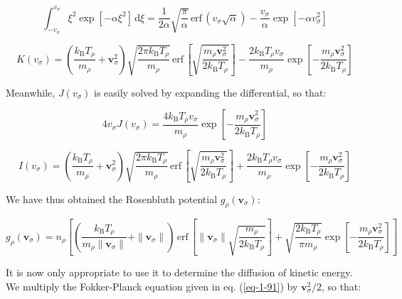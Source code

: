 \begin{equation}
    \int_{-v_\sigma}^{v_\sigma}\xi^2\exp{[-\alpha\xi^2]}\,\mathrm{d}\xi=\frac{1}{2\alpha}\sqrt{\frac{\pi}{\alpha}}\,\text{erf}\,(v_\sigma\sqrt{\alpha})-\frac{v_\sigma}{\alpha}\exp{[-\alpha v_\sigma^2]}
\end{equation}

\begin{equation}
    K(v_\sigma)=\left(\frac{k_\mathrm{B}T_\rho}{m_\rho}+\mathbf{v}_\sigma^2\right)\sqrt{\frac{2\pi k_\mathrm{B}T_\rho}{m_\rho}}\,\text{erf}\,\left[\sqrt{\frac{m_\rho\mathbf{v}_\sigma^2}{2k_\mathrm{B}T_\rho}}\right]-\frac{2k_\mathrm{B}T_\rho v_\sigma}{m_\rho}\exp{\left[-\frac{m_\rho\mathbf{v}_\sigma^2}{2k_\mathrm{B}T_\rho}\right]}
\end{equation}

Meanwhile, $J(v_\sigma)$ is easily solved by expanding the differential, so that:

\begin{equation}
    4v_\sigma J(v_\sigma)=\frac{4k_\mathrm{B}T_\rho v_\sigma}{m_\rho}\exp{\left[-\frac{m_\rho\mathbf{v}_\sigma^2}{2k_\mathrm{B}T_\rho}\right]}
\end{equation}

\begin{equation}
    I(v_\sigma)=\left(\frac{k_\mathrm{B}T_\rho}{m_\rho}+\mathbf{v}_\sigma^2\right)\sqrt{\frac{2\pi k_\mathrm{B}T_\rho}{m_\rho}}\,\text{erf}\,\left[\sqrt{\frac{m_\rho\mathbf{v}_\sigma^2}{2k_\mathrm{B}T_\rho}}\right]+\frac{2k_\mathrm{B}T_\rho v_\sigma}{m_\rho}\exp{\left[-\frac{m_\rho\mathbf{v}_\sigma^2}{2k_\mathrm{B}T_\rho}\right]}
\end{equation}

We have thus obtained the Rosenbluth potential $g_\rho(\mathbf{v}_\sigma)$:

\begin{equation}
    g_\rho(\mathbf{v}_\sigma)=n_\rho\left[\left(\frac{k_\mathrm{B}T_\rho}{m_\rho\|\mathbf{v}_\sigma\|}+\|\mathbf{v}_\sigma\|\right)\,\text{erf}\,\left[\|\mathbf{v}_\sigma\|\sqrt{\frac{m_\rho}{2k_\mathrm{B}T_\rho}}\right]+\sqrt{\frac{2k_\mathrm{B}T_\rho}{\pi m_\rho}}\exp{\left[-\frac{m_\rho\mathbf{v}_\sigma^2}{2k_\mathrm{B}T_\rho}\right]}\right]
\end{equation}

It is now only appropriate to use it to determine the diffusion of kinetic energy. We multiply the Fokker-Planck equation given in eq. (\ref{eq-1-91}) by $\mathbf{v}_\sigma^2/2$, so that:

\iffalse

